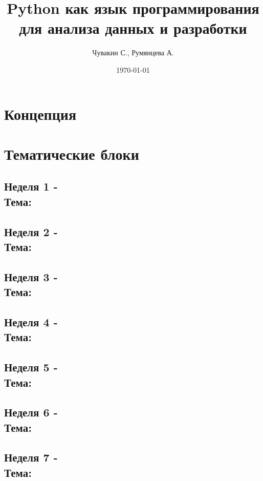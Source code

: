 \documentclass[a4paper,11pt]{article}
\author{Чувакин С., Румянцева А.}
\title{Python как язык программирования для анализа данных и разработки}
\date{\today}
\begin{document}
\begin{titlepage}
\noindent	
\maketitle
\end{titlepage}

\section{Концепция}

\section{Тематические блоки}

\subsection{Неделя 1 - \\ Тема: }

\subsection{Неделя 2 - \\ Тема: }

\subsection{Неделя 3 - \\ Тема: }

\subsection{Неделя 4 - \\ Тема: }

\subsection{Неделя 5 - \\ Тема: }

\subsection{Неделя 6 - \\ Тема: }

\subsection{Неделя 7 - \\ Тема: }
\end{document}
